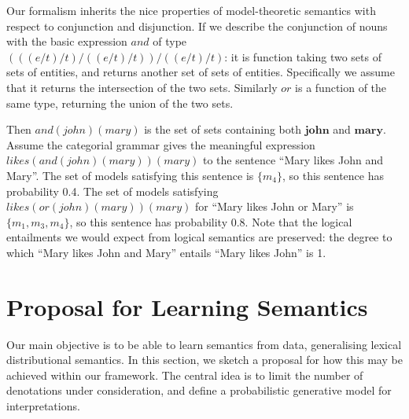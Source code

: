 \documentclass[letterpaper]{article}
\newcommand{\citet}[1]{\newcite{#1}}
\begin{document}
Our formalism inherits the nice properties of model-theoretic
semantics with respect to conjunction and disjunction. If we describe
the conjunction of nouns with the basic expression $\mathit{and}$ of
type $(((e/t)/t)/((e/t)/t))/((e/t)/t)$: it is function taking two sets
of sets of entities, and returns another set of sets of
entities. Specifically we assume that it returns the intersection of
the two sets. Similarly $\mathit{or}$ is a function of the same type,
returning the union of the two sets.

Then $\mathit{and}(john)(mary)$ is the set of sets containing both
$\mathbf{john}$ and $\mathbf{mary}$. Assume the categorial grammar
gives the meaningful expression
$\mathit{likes}(\mathit{and}(\mathit{john})(\mathit{mary}))(\mathit{mary})$
to the sentence ``Mary likes John and Mary''. The set of models
satisfying this sentence is $\{m_4\}$, so this sentence has
probability 0.4. The set of models satisfying
$\mathit{likes}(\mathit{or}(\mathit{john})(\mathit{mary}))(\mathit{mary})$
for ``Mary likes John or Mary'' is $\{m_1, m_3, m_4\}$, so this
sentence has probability 0.8. Note that the logical entailments we
would expect from logical semantics are preserved: the degree to which
``Mary likes John and Mary'' entails ``Mary likes John'' is 1.



\section{Proposal for Learning Semantics}
\label{section:distributions}

Our main objective is to be able to learn semantics from data,
generalising lexical distributional semantics. In this section, we
sketch a proposal for how this may be achieved within our
framework. The central idea is to limit the number of denotations
under consideration, and define a probabilistic generative model for
interpretations.
\end{document}
